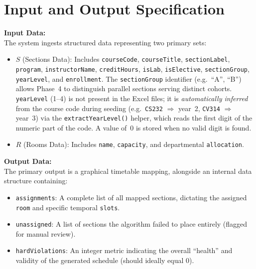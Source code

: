 \documentclass[12pt, a4paper]{article}
\begin{document}
\section{Input and Output Specification}

\noindent\textbf{Input Data:}\\[4pt]
The system ingests structured data representing two primary sets:

\begin{itemize}[noitemsep, topsep=4pt]
    \item $S$ (Sections Data): Includes \texttt{courseCode}, \texttt{courseTitle},
          \texttt{sectionLabel}, \texttt{program}, \texttt{instructorName},
          \texttt{creditHours}, \texttt{isLab}, \texttt{isElective},
          \texttt{sectionGroup}, \texttt{yearLevel}, and \texttt{enrollment}.
          The \texttt{sectionGroup} identifier (e.g.\ ``A'', ``B'') allows Phase~4
          to distinguish parallel sections serving distinct cohorts.
          \texttt{yearLevel} (1--4) is not present in the Excel files; it is
          \textit{automatically inferred} from the course code during seeding
          (e.g.\ \texttt{CS232} $\Rightarrow$ year~2, \texttt{CV314} $\Rightarrow$
          year~3) via the \texttt{extractYearLevel()} helper, which reads the first
          digit of the numeric part of the code. A value of~0 is stored when no
          valid digit is found.

    \item $R$ (Rooms Data): Includes \texttt{name}, \texttt{capacity}, and
          departmental \texttt{allocation}.
\end{itemize}

\noindent\textbf{Output Data:}\\[4pt]
The primary output is a graphical timetable mapping, alongside an internal data
structure containing:

\begin{itemize}[noitemsep, topsep=4pt]
    \item \texttt{assignments}: A complete list of all mapped sections, dictating the
          assigned \texttt{room} and specific temporal \texttt{slots}.

    \item \texttt{unassigned}: A list of sections the algorithm failed to place entirely
          (flagged for manual review).

    \item \texttt{hardViolations}: An integer metric indicating the overall ``health''
          and validity of the generated schedule (should ideally equal 0).
\end{itemize}
\end{document}
